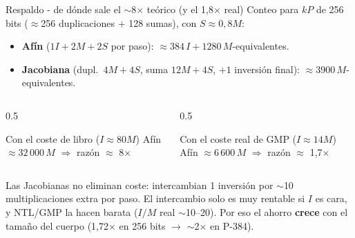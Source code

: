 \documentclass[aspectratio=169,11pt]{beamer}
\begin{document}
\begin{frame}[noframenumbering]{Respaldo - de dónde sale el $\sim$8$\times$ teórico (y el
    1{,}8$\times$ real)}
  \footnotesize
  Conteo para $kP$ de 256 bits ($\approx$256 duplicaciones $+$ 128 sumas), con
  $S\approx0{,}8M$:
  \begin{itemize}\footnotesize
    \item \textbf{Afín} ($1I+2M+2S$ por paso): $\approx 384\,I + 1280\,M$-equivalentes.
    \item \textbf{Jacobiana} (dupl.\ $4M+4S$, suma $12M+4S$, $+1$ inversión final):
          $\approx 3900\,M$-equivalentes.
  \end{itemize}
  \vspace{0.5ex}
  \begin{columns}[t]
    \begin{column}{0.5\textwidth}
      \begin{block}{Con el coste de libro ($I\approx80M$)}
        Afín $\approx 32\,000\,M$ $\Rightarrow$ razón $\approx$ \alert{8$\times$}
      \end{block}
    \end{column}
    \begin{column}{0.5\textwidth}
      \begin{block}{Con el coste real de GMP ($I\approx14M$)}
        Afín $\approx 6\,600\,M$ $\Rightarrow$ razón $\approx$ \alert{1{,}7$\times$}
      \end{block}
    \end{column}
  \end{columns}
  \vspace{0.5ex}
  Las Jacobianas no eliminan coste: \alert{intercambian} 1 inversión por $\sim$10
  multiplicaciones extra por paso. El intercambio solo es muy rentable si $I$ es cara, y
  NTL/GMP la hacen barata ($I/M$ real $\sim$10--20). Por eso el ahorro \textbf{crece} con el
  tamaño del cuerpo (1{,}72$\times$ en 256 bits $\to$ $\sim$2$\times$ en P-384).
\end{frame}
\end{document}
